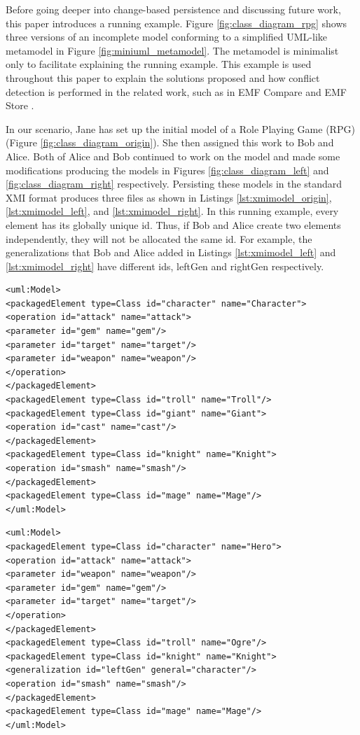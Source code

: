 Before going deeper into change-based persistence and discussing future work, this paper introduces a running example. Figure \ref{fig:class_diagram_rpg} shows three versions of an incomplete model conforming to a simplified UML-like metamodel in Figure \ref{fig:miniuml_metamodel}. The metamodel is minimalist only to facilitate explaining the running example. This example is used throughout this paper to explain the solutions proposed and how conflict detection is performed in the related work, such as in EMF Compare \cite{emfcompare2018developer} and EMF Store \cite{emfstore2019what}. 

In our scenario, Jane has set up the initial model of a Role Playing Game (RPG) (Figure \ref{fig:class_diagram_origin}). She then assigned this work to Bob and Alice. Both of Alice and Bob continued to work on the model and made some modifications producing the models in Figures \ref{fig:class_diagram_left} and \ref{fig:class_diagram_right} respectively. Persisting these models in the standard XMI \cite{omg2018xmi} format produces three files as shown in Listings \ref{lst:xmimodel_origin}, \ref{lst:xmimodel_left}, and \ref{lst:xmimodel_right}. In this running example, every element has its globally unique id. Thus, if Bob and Alice create two elements independently, they will not be allocated the same id. For example, the generalizations that Bob and Alice added in Listings \ref{lst:xmimodel_left} and \ref{lst:xmimodel_right} have different ids, \textsf{leftGen} and \textsf{rightGen} respectively.  
\begin{lstlisting}[style=xmi,caption={Simplified XMI file of the original version in Figure \ref{fig:class_diagram_origin}.},label=lst:xmimodel_origin]
<uml:Model>
<packagedElement type=Class id="character" name="Character">
<operation id="attack" name="attack">
<parameter id="gem" name="gem"/>
<parameter id="target" name="target"/>
<parameter id="weapon" name="weapon"/>
</operation>
</packagedElement>
<packagedElement type=Class id="troll" name="Troll"/>
<packagedElement type=Class id="giant" name="Giant">
<operation id="cast" name="cast"/>
</packagedElement>
<packagedElement type=Class id="knight" name="Knight">
<operation id="smash" name="smash"/>
</packagedElement>
<packagedElement type=Class id="mage" name="Mage"/>
</uml:Model>
\end{lstlisting}

\begin{lstlisting}[style=xmi,caption={Simplified XMI file of the left version in Figure \ref{fig:class_diagram_left}.},label=lst:xmimodel_left]
<uml:Model>
<packagedElement type=Class id="character" name="Hero">
<operation id="attack" name="attack">
<parameter id="weapon" name="weapon"/>
<parameter id="gem" name="gem"/>
<parameter id="target" name="target"/>
</operation>  
</packagedElement>
<packagedElement type=Class id="troll" name="Ogre"/>
<packagedElement type=Class id="knight" name="Knight">
<generalization id="leftGen" general="character"/>
<operation id="smash" name="smash"/>
</packagedElement>
<packagedElement type=Class id="mage" name="Mage"/>
</uml:Model>
\end{lstlisting}

